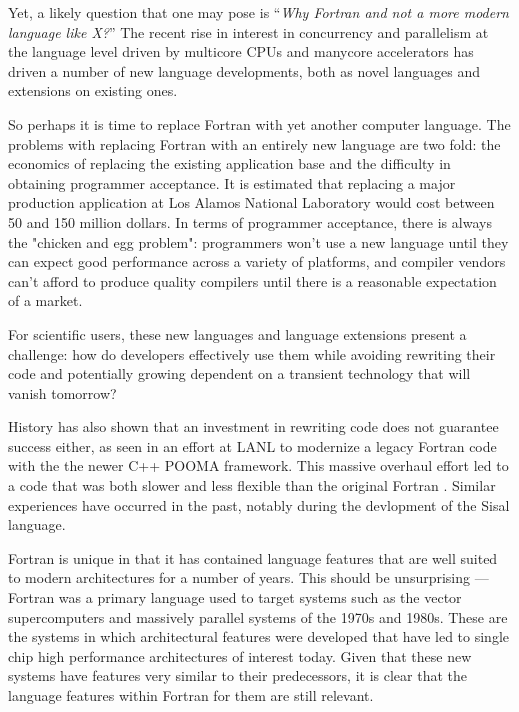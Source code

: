 Yet, a likely question that one may pose is ``\emph{Why Fortran and not a more
  modern language like X?}''  The recent rise in interest in concurrency and
parallelism at the language level driven by multicore CPUs and manycore
accelerators has driven a number of new language developments, both as novel
languages and extensions on existing ones.

So perhaps it is time to replace Fortran with yet another computer language.  The
problems with replacing Fortran with an entirely new language are two fold:
the economics of replacing the existing application base and the difficulty in
obtaining programmer acceptance.  It is estimated that replacing a major
production application at Los Alamos National Laboratory would cost between 50
and 150 million dollars.  In terms of programmer acceptance, there is always
the "chicken and egg problem": programmers won't use a new language until they
can expect good performance across a variety of platforms, and compiler
vendors can't afford to produce quality compilers until there is a reasonable
expectation of a market.

For scientific users, these new languages and language extensions
present a challenge: how do developers effectively use them while
avoiding rewriting their code and potentially growing dependent on a
transient technology that will vanish tomorrow?

History has also shown that an investment in rewriting code does not guarantee
success either, as seen in an effort at LANL to modernize a legacy Fortran
code with the the newer C++ POOMA framework.  This massive overhaul effort led
to a code that was both slower and less flexible than the original Fortran
\cite{}.  Similar experiences have occurred in the past, notably during the
devlopment of the Sisal language.

Fortran is unique in that it has contained language features that are
well suited to modern architectures for a number of years.  This
should be unsurprising --- Fortran was a primary language used to
target systems such as the vector supercomputers and massively
parallel systems of the 1970s and 1980s.  These are the systems in
which architectural features were developed that have led to single
chip high performance architectures of interest today.  Given that
these new systems have features very similar to their predecessors, it
is clear that the language features within Fortran for them are still
relevant.

